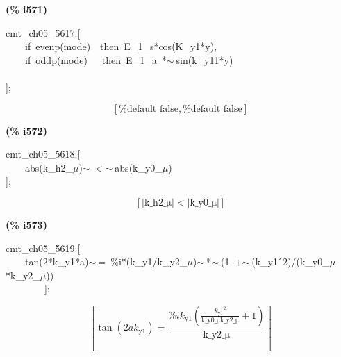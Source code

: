 \documentclass[fleqn]{article}
\begin{document}
\noindent
\begin{minipage}[t]{4.000000em}\color{red}\bfseries
(\% i571)	
\end{minipage}
\begin{minipage}[t]{\textwidth}\color{blue}
cmt\_ch05\_5617:[\\
\ \ \ \ if\ evenp(mode)\ \ then\ E\_1\_s*cos(K\_y1*y),\\
\ \ \ \ if\ oddp(mode)\ \ \ then\ E\_1\_a\ *\ensuremath{\sim\ }sin(k\_y11*y)\\
\\
];
\end{minipage}
\[\displaystyle \tag{\% o571} 
\left[ \mbox{%
false}\operatorname{,}\mbox{%
false}\right] \mbox{}
\]


\noindent
\begin{minipage}[t]{4.000000em}\color{red}\bfseries
(\% i572)	
\end{minipage}
\begin{minipage}[t]{\textwidth}\color{blue}
cmt\_ch05\_5618:[\\
\ \ \ \ abs(k\_h2\_\ensuremath{\mu})\ensuremath{\sim\ }\ensuremath{<}\ensuremath{\sim\ }abs(k\_y0\_\ensuremath{\mu})\\
];
\end{minipage}
\[\displaystyle \tag{\% o572} 
\left[ \left| \ensuremath{\mathrm{k\_ h2\_ \mu }}\right| \operatorname{<  }\left| \ensuremath{\mathrm{k\_ y0\_ \mu }}\right| \right] \mbox{}
\]


\noindent
\begin{minipage}[t]{4.000000em}\color{red}\bfseries
(\% i573)	
\end{minipage}
\begin{minipage}[t]{\textwidth}\color{blue}
cmt\_ch05\_5619:[\\
\ \ \ \ tan(2*k\_y1*a)\ensuremath{\sim\ }=\ \%i*(k\_y1/k\_y2\_\ensuremath{\mu})\ensuremath{\sim\ }*\ensuremath{\sim\ }(1\ +\ensuremath{\sim\ }(k\_y1\^\ 2)/(k\_y0\_\ensuremath{\mu}*k\_y2\_\ensuremath{\mu}))\\
\ \ \ \ \ \ \ \ ];
\end{minipage}
\[\displaystyle \tag{\% o573} 
\left[ \tan{\left( 2 a {k_{\ensuremath{\mathrm{y1}}}}\right) }=\frac{\% i {k_{\ensuremath{\mathrm{y1}}}} \left( \frac{{{{k_{\ensuremath{\mathrm{y1}}}}}^{2}}}{\ensuremath{\mathrm{k\_ y0\_ \mu }} \ensuremath{\mathrm{k\_ y2\_ \mu }}}+1\right) }{\ensuremath{\mathrm{k\_ y2\_ \mu }}}\right] \mbox{}
\]
\end{document}

